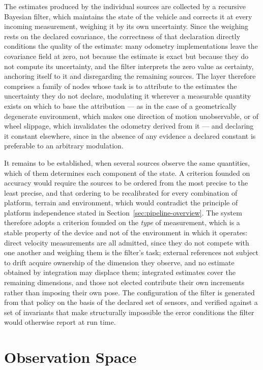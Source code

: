 The estimates produced by the individual sources are collected by a recursive
Bayesian filter, which maintains the state of the vehicle and corrects it at
every incoming measurement, weighing it by its own uncertainty. Since the
weighing rests on the declared covariance, the correctness of that declaration
directly conditions the quality of the estimate: many odometry implementations
leave the covariance field at zero, not because the estimate is exact but
because they do not compute its uncertainty, and the filter interprets the zero
value as certainty, anchoring itself to it and disregarding the remaining
sources. The layer therefore comprises a family of nodes whose task is to
attribute to the estimates the uncertainty they do not declare, modulating it
wherever a measurable quantity exists on which to base the attribution --- as in
the case of a geometrically degenerate environment, which makes one direction of
motion unobservable, or of wheel slippage, which invalidates the odometry
derived from it --- and declaring it constant elsewhere, since in the absence of
any evidence a declared constant is preferable to an arbitrary modulation.

It remains to be established, when several sources observe the same quantities,
which of them determines each component of the state. A criterion founded on
accuracy would require the sources to be ordered from the most precise to the
least precise, and that ordering to be recalibrated for every combination of
platform, terrain and environment, which would contradict the principle of
platform independence stated in Section~\ref{sec:pipeline-overview}. The system
therefore adopts a criterion founded on the \emph{type} of measurement, which is
a stable property of the device and not of the environment in which it operates:
direct velocity measurements are all admitted, since they do not compete with
one another and weighing them is the filter's task; external references not
subject to drift acquire ownership of the dimension they observe, and no
estimate obtained by integration may displace them; integrated estimates cover
the remaining dimensions, and those not elected contribute their own increments
rather than imposing their own pose. The configuration of the filter is
generated from that policy on the basis of the declared set of sensors, and
verified against a set of invariants that make structurally impossible the error
conditions the filter would otherwise report at run time.

\section{Observation Space}
\label{sec:observation-space}

